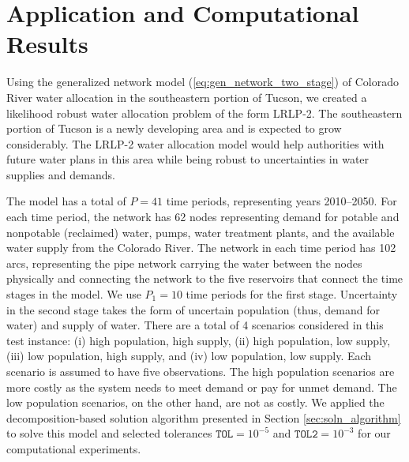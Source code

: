 \documentclass[11pt]{article}
\begin{document}
\section{Application and Computational Results} \label{sec:comp_results}

Using the generalized network model (\ref{eq:gen_network_two_stage}) of Colorado River water allocation in the southeastern portion of Tucson, we created a likelihood robust water allocation problem of the form LRLP-2.
The southeastern portion of Tucson is a newly developing area and is expected to grow considerably. 
The LRLP-2 water allocation model would help authorities with future water plans in this area while being robust to uncertainties in water supplies and demands.

The model has a total of $P = 41$ time periods, representing years 2010--2050. 
For each time period, the network has 62 nodes representing demand for potable and nonpotable (reclaimed) water, pumps, water treatment plants, and the available water supply from the Colorado River.
The network in each time period has 102 arcs, representing the pipe network carrying the water between the nodes physically and connecting the network to the five reservoirs that connect the time stages in the model.
We use $P_1 = 10$ time periods for the first stage.
Uncertainty in the second stage takes the form of uncertain population (thus, demand for water) and supply of water.
There are a total of 4 scenarios considered in this test instance: (i) high population, high supply, (ii) high population, low supply, (iii) low population, high supply, and (iv) low population, low supply.
Each scenario is assumed to have five observations.
The high population scenarios are more costly as the system needs to meet demand or pay for unmet demand.
The low population scenarios, on the other hand, are not as costly. 
We applied the decomposition-based solution algorithm presented in Section \ref{sec:soln_algorithm} to solve this model and selected tolerances $\texttt{TOL} = 10^{-5}$ and $\texttt{TOL2} = 10^{-3}$ for our computational experiments.
\end{document}
